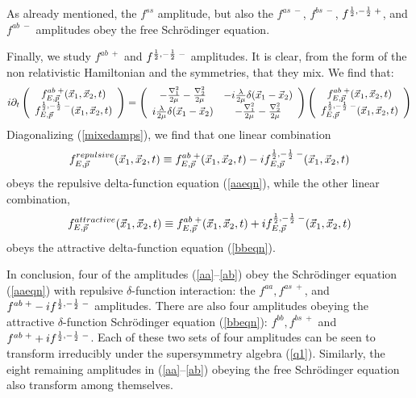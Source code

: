 \documentclass[11pt]{article}
\begin{document}
  
  As already mentioned, the $f^{ss}$ amplitude, but also the $f^{as \; -}$, $f^{bs \; -}$,  $f^{{1\over 2},-{1\over 2} \; +}$, and $f^{ab \; -}$ amplitudes obey the free Schr\" odinger equation.

  
Finally, we study $f^{ab \; +}$ and $f^{{1\over 2},-{1\over 2} \; -}$ amplitudes. It is clear, from the form of the non relativistic Hamiltonian and the symmetries, that they mix.
We find that:
  \begin{equation}
  \label{mixedamps}
  i \partial_t \left(\begin{array}{c} f^{ab\; +}_{E,\vec{p}}(\vec{x}_1,\vec{x}_2,t) \\ f^{{1\over 2},-{1\over 2} \; -}_{E,\vec{p}}(\vec{x}_1,\vec{x}_2,t) \end{array} \right) =  \left(\begin{array}{cc}- {\nabla_1^2 \over 2 \mu} - {\nabla_2^2 \over 2 \mu}  &  - i {\lambda \over 2 \mu} \delta(\vec{x}_1 - \vec{x}_2)\\   i {\lambda \over 2 \mu} \delta(\vec{x}_1 - \vec{x}_2)& - {\nabla_1^2 \over 2 \mu} - {\nabla_2^2 \over 2 \mu}\end{array} \right)    \left(\begin{array}{c} f^{ab\; +}_{E,\vec{p}}(\vec{x}_1,\vec{x}_2,t) \\ f^{{1\over 2},-{1\over 2} \; -}_{E,\vec{p}}(\vec{x}_1,\vec{x}_2,t) \end{array} \right)\end{equation}
Diagonalizing (\ref{mixedamps}), we find that one linear combination
 \begin{equation}
 \label{mixedrepulsive}
f^{repulsive}_{E,\vec{p}}(\vec{x}_1,\vec{x}_2,t) \equiv  f^{ab\; +}_{E,\vec{p}}(\vec{x}_1,\vec{x}_2,t) - i f^{{1\over 2},-{1\over 2} \; -}_{E,\vec{p}}(\vec{x}_1,\vec{x}_2,t) 
 \end{equation}
  obeys the repulsive delta-function equation (\ref{aaeqn}), while the other linear combination,
  \begin{equation}
  \label{mixedattractive}
f^{attractive}_{E,\vec{p}}(\vec{x}_1,\vec{x}_2,t) \equiv   f^{ab\; +}_{E,\vec{p}}(\vec{x}_1,\vec{x}_2,t) + i f^{{1\over 2},-{1\over 2} \; -}_{E,\vec{p}}(\vec{x}_1,\vec{x}_2,t) 
  \end{equation}
 obeys the attractive delta-function equation (\ref{bbeqn}). 
 
In conclusion,  four of the  amplitudes (\ref{aa}--\ref{ab})  obey  the Schr\" odinger equation (\ref{aaeqn}) with repulsive $\delta$-function interaction: the $f^{aa}, f^{as \; +}$, and $f^{ab \; +}- i f^{{1\over 2},-{1\over 2} \; -}$ amplitudes. 
There are also four amplitudes obeying the attractive $\delta$-function Schr\" odinger equation (\ref{bbeqn}): $f^{bb}, f^{bs \; +}$ and $f^{ab \; +} + i f^{{1\over 2},-{1\over 2} \; -}$. Each of these two sets of four amplitudes  can be seen to transform irreducibly under the supersymmetry algebra (\ref{q1}). Similarly, the eight remaining amplitudes in (\ref{aa}--\ref{ab}) obeying the free Schr\" odinger equation also transform among themselves.
 
\end{document}
